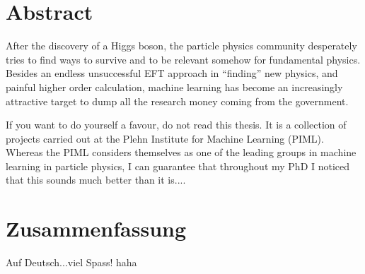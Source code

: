 %
%
\thispagestyle{empty}
%
\vspace*{1cm}
\section*{Abstract}

After the discovery of a Higgs boson, the particle physics community
desperately tries to find ways to survive and to be relevant somehow
for fundamental physics. Besides an endless unsuccessful EFT approach
in ``finding'' new physics, and painful higher order calculation,
machine learning has become an increasingly attractive target to dump
all the research money coming from the government. 

If you want to do yourself a favour, do not read this thesis. It is a
collection of projects carried out at the Plehn Institute for Machine
Learning (PIML). Whereas the PIML considers themselves as one of the
leading groups in machine learning in particle physics, I can
guarantee that throughout my PhD I noticed that this sounds much
better than it is....

\vspace*{2.2cm}
\section*{Zusammenfassung}

Auf Deutsch...viel Spass! haha

%
